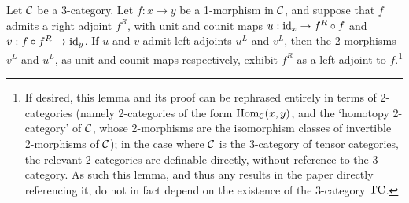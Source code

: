 \documentclass{amsart}
\begin{document}
\begin{lemma} \label{lem-ambiadjoints}
	Let $\mathcal C$ be a 3-category. Let $f: x \to y$ be a 1-morphism in $\mathcal C$, and suppose that $f$ admits a right adjoint $f^R$,  with unit and counit maps $u:\mathrm{id}_x \to f^R \circ f$ and $v:f \circ f^R \to \mathrm{id}_y$. If $u$ and $v$ admit left adjoints $u^L$ and $v^L$, then the 2-morphisms $v^L$ and $u^L$, as unit and counit maps respectively, exhibit $f^R$ as a left adjoint to $f$.\footnote{If desired, this lemma and its proof can be rephrased entirely in terms of 2-categories (namely 2-categories of the form $\operatorname{Hom}_\mathcal C(x,y)$, and the `homotopy 2-category' of $\mathcal C$, whose 2-morphisms are the isomorphism classes of invertible 2-morphisms of $\mathcal C$); in the case where $\mathcal C$ is the 3-category of tensor categories, the relevant 2-categories are definable directly, without reference to the 3-category.  As such this lemma, and thus any results in the paper directly referencing it, do not in fact depend on the existence of the 3-category $\mathrm{TC}$.}
\end{lemma}
\end{document}
